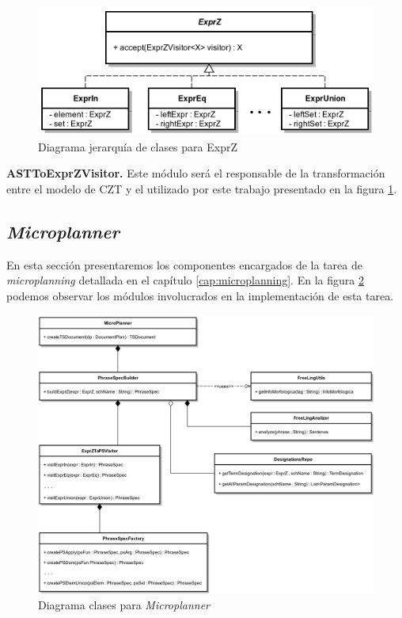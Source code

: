 \begin{figure}[H]
  	\centering
	\includegraphics[scale=0.31]{img/exprz_imp.png}
	\caption{Diagrama jerarquía de clases para ExprZ}
  	\label{fig:imp_exprz}
\end{figure}

\bigskip
\noindent
\textbf{ASTToExprZVisitor.} Este módulo será el responsable de la transformación entre el modelo de CZT y el utilizado por este trabajo presentado en la figura \ref{fig:imp_exprz}.


\subsection{\textit{Microplanner}}

En esta sección presentaremos los componentes encargados de la tarea de \textit{microplanning} detallada en el capítulo \ref{cap:microplanning}. En la figura \ref{fig:imp_microplanner} podemos observar los módulos involucrados en la implementación de esta tarea.

\begin{figure}[H]
  	\centering
	\includegraphics[scale=0.2]{img/microplanner_imp.png}
	\caption{Diagrama clases para \textit{Microplanner}}
  	\label{fig:imp_microplanner}
\end{figure}

